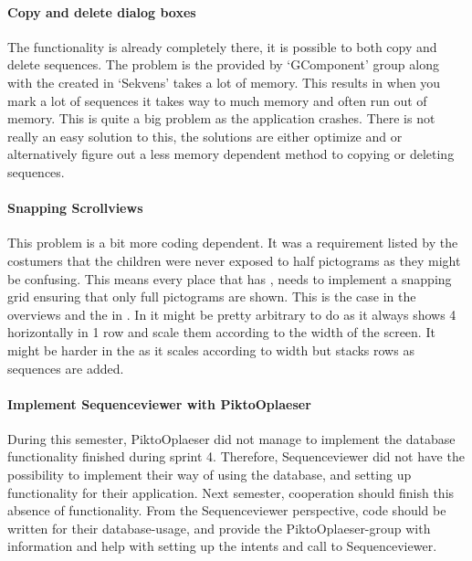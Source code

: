 \paragraph{Copy and delete dialog boxes} The functionality is already completely there, it is possible to both copy and delete sequences. The problem is the  provided by `GComponent' group along with the  created in `Sekvens' takes a lot of memory. This results in when you mark a lot of sequences it takes way to much memory and often run out of memory. This is quite a big problem as the application crashes. There is not really an easy solution to this, the solutions are either optimize  and  or alternatively figure out a less memory dependent method to copying or deleting sequences. 

\paragraph{Snapping Scrollviews} This problem is a bit more coding dependent. It was a requirement listed by the costumers  that the children were never exposed to half pictograms as they might be confusing. This means every place that has , needs to implement a snapping grid ensuring that only full pictograms are shown. This is the case in the overviews  and the  in . In  it might be pretty arbitrary to do as it always shows 4  horizontally in 1 row and scale them according to the width of the screen. It might be harder in the  as it scales according to width but stacks rows as sequences are added. 

\paragraph{Implement Sequenceviewer with PiktoOplaeser}
During this semester, PiktoOplaeser did not manage to implement the database functionality finished during sprint 4. Therefore, Sequenceviewer did not have the possibility to implement their way of using the database, and setting up functionality for their application. Next semester, cooperation should finish this absence of functionality. From the Sequenceviewer perspective, code should be written for their database-usage, and provide the PiktoOplaeser-group with information and help with setting up the intents and call to Sequenceviewer.

